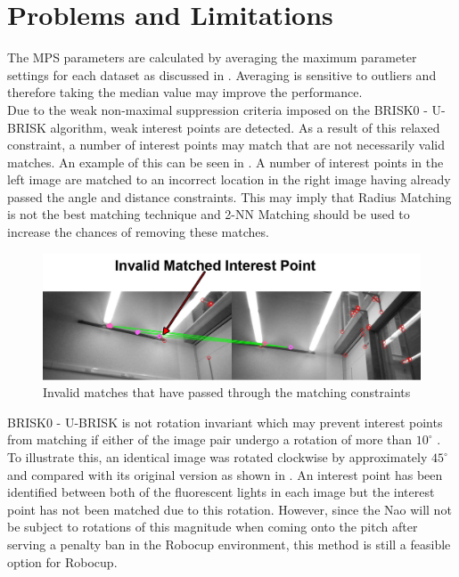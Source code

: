 \section{Problems and Limitations}
\label{sec:problemsLimitations}
The MPS parameters are calculated by averaging the maximum parameter settings for each dataset as discussed in . Averaging is sensitive to outliers and therefore taking the median value may improve the performance.\\

Due to the weak non-maximal suppression criteria imposed on the BRISK0 - U-BRISK algorithm, weak interest points are detected.  As a result of this relaxed constraint, a number of interest points may match that are not necessarily valid matches. An example of this can be seen in . A number of interest points in the left image are matched to an incorrect location in the right image having already passed the angle and distance constraints. This may imply that Radius Matching is not the best matching technique and 2-NN Matching should be used to increase the chances of removing these matches.\\

\begin{figure}
  \centering
    \includegraphics[width=1.0\textwidth]{../Drawings/Matching/dataset_valid_invalid_matches_photo.jpg}
    \caption{Invalid matches that have passed through the matching constraints} 
    \label{fig:weak}
\end{figure}

BRISK0 - U-BRISK is not rotation invariant which may prevent interest points from matching if either of the image pair undergo a rotation of more than $10^{\circ}$ \cite{Leutenegger2011}. To illustrate this, an identical image was rotated clockwise by approximately $45^{\circ}$ and compared with its original version as shown in . An interest point has been identified between both of the fluorescent lights in each image but the interest point has not been matched due to this rotation. However, since the Nao will not be subject to rotations of this magnitude when coming onto the pitch after serving a penalty ban in the Robocup environment, this method is still a feasible option for Robocup. \\

